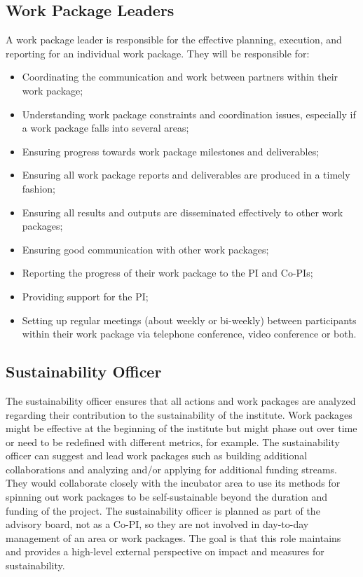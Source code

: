 \documentclass[
]{book}
\providecommand{\tightlist}{%
  \setlength{\itemsep}{0pt}\setlength{\parskip}{0pt}}
\begin{document}
\hypertarget{work-package-leaders}{%
\subsection{Work Package Leaders}\label{work-package-leaders}}

A work package leader is responsible for the effective planning, execution, and reporting for an individual work package.
They will be responsible for:

\begin{itemize}
\tightlist
\item
  Coordinating the communication and work between partners within their work package;
\item
  Understanding work package constraints and coordination issues, especially if a work package falls into several areas;
\item
  Ensuring progress towards work package milestones and deliverables;
\item
  Ensuring all work package reports and deliverables are produced in a timely fashion;
\item
  Ensuring all results and outputs are disseminated effectively to other work packages;
\item
  Ensuring good communication with other work packages;
\item
  Reporting the progress of their work package to the PI and Co-PIs;
\item
  Providing support for the PI;
\item
  Setting up regular meetings (about weekly or bi-weekly) between participants within their work package
  via telephone conference, video conference or both.
\end{itemize}

\hypertarget{sustainability-officer}{%
\subsection{Sustainability Officer}\label{sustainability-officer}}

The sustainability officer ensures that all actions and work packages are analyzed regarding their
contribution to the sustainability of the institute. Work packages might be effective at the beginning
of the institute but might phase out over time or need to be redefined with different metrics, for
example. The sustainability officer can suggest and lead work packages such as building additional
collaborations and analyzing and/or applying for additional funding streams. They would collaborate
closely with the incubator area to use its methods for spinning out work packages to be self-sustainable
beyond the duration and funding of the project. The sustainability officer is planned as part of the
advisory board, not as a Co-PI, so they are not involved in day-to-day management of an area or work packages.
The goal is that this role maintains and provides a high-level external perspective on impact and measures for sustainability.
\end{document}
